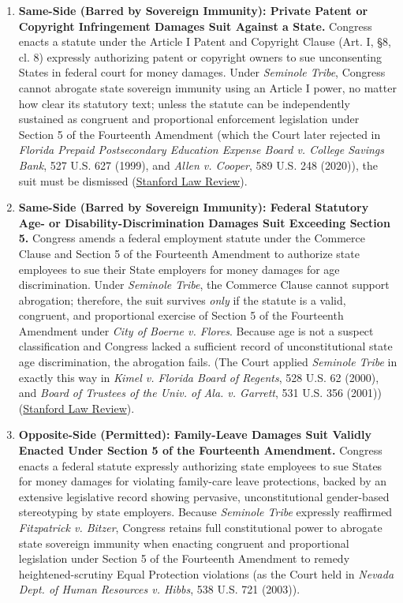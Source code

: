 \documentclass[12pt]{article}
\begin{document}
\begin{enumerate}
\item \textbf{Same-Side (Barred by Sovereign Immunity): Private Patent or Copyright Infringement Damages Suit Against a State.} Congress enacts a statute under the Article I Patent and Copyright Clause (Art. I, \S 8, cl. 8) expressly authorizing patent or copyright owners to sue unconsenting States in federal court for money damages. Under \textit{Seminole Tribe}, Congress cannot abrogate state sovereign immunity using an Article I power, no matter how clear its statutory text; unless the statute can be independently sustained as congruent and proportional enforcement legislation under Section 5 of the Fourteenth Amendment (which the Court later rejected in \textit{Florida Prepaid Postsecondary Education Expense Board v. College Savings Bank}, 527 U.S. 627 (1999), and \textit{Allen v. Cooper}, 589 U.S. 248 (2020)), the suit must be dismissed (\href{http://www.stanfordlawreview.org/wp-content/uploads/sites/3/2010/04/chemerinsky.pdf}{Stanford Law Review}).

\item \textbf{Same-Side (Barred by Sovereign Immunity): Federal Statutory Age- or Disability-Discrimination Damages Suit Exceeding Section 5.} Congress amends a federal employment statute under the Commerce Clause and Section 5 of the Fourteenth Amendment to authorize state employees to sue their State employers for money damages for age discrimination. Under \textit{Seminole Tribe}, the Commerce Clause cannot support abrogation; therefore, the suit survives \textit{only} if the statute is a valid, congruent, and proportional exercise of Section 5 of the Fourteenth Amendment under \textit{City of Boerne v. Flores}. Because age is not a suspect classification and Congress lacked a sufficient record of unconstitutional state age discrimination, the abrogation fails. (The Court applied \textit{Seminole Tribe} in exactly this way in \textit{Kimel v. Florida Board of Regents}, 528 U.S. 62 (2000), and \textit{Board of Trustees of the Univ. of Ala. v. Garrett}, 531 U.S. 356 (2001)) (\href{http://www.stanfordlawreview.org/wp-content/uploads/sites/3/2010/04/chemerinsky.pdf}{Stanford Law Review}).

\item \textbf{Opposite-Side (Permitted): Family-Leave Damages Suit Validly Enacted Under Section 5 of the Fourteenth Amendment.} Congress enacts a federal statute expressly authorizing state employees to sue States for money damages for violating family-care leave protections, backed by an extensive legislative record showing pervasive, unconstitutional gender-based stereotyping by state employers. Because \textit{Seminole Tribe} expressly reaffirmed \textit{Fitzpatrick v. Bitzer}, Congress retains full constitutional power to abrogate state sovereign immunity when enacting congruent and proportional legislation under Section 5 of the Fourteenth Amendment to remedy heightened-scrutiny Equal Protection violations (as the Court held in \textit{Nevada Dept. of Human Resources v. Hibbs}, 538 U.S. 721 (2003)).


\end{enumerate}
\end{document}
